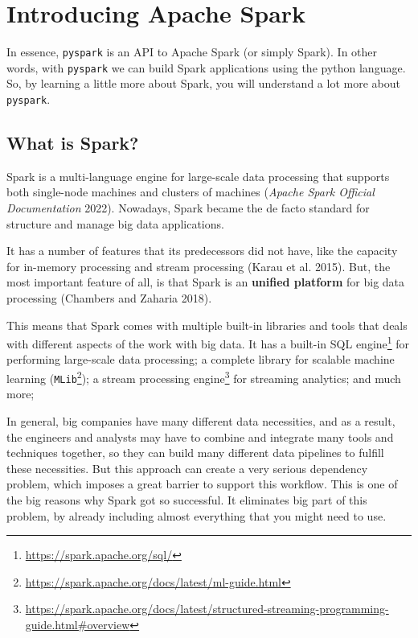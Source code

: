 \documentclass[
  11pt,
  letterpaper,
  DIV=11,
  numbers=noendperiod]{scrreprt}
\begin{document}

\hypertarget{sec-introd-spark}{%
\chapter{Introducing Apache Spark}\label{sec-introd-spark}}

In essence, \texttt{pyspark} is an API to Apache Spark (or simply
Spark). In other words, with \texttt{pyspark} we can build Spark
applications using the python language. So, by learning a little more
about Spark, you will understand a lot more about \texttt{pyspark}.

\hypertarget{what-is-spark}{%
\section{What is Spark?}\label{what-is-spark}}

Spark is a multi-language engine for large-scale data processing that
supports both single-node machines and clusters of machines
(\emph{Apache Spark Official Documentation} 2022). Nowadays, Spark
became the de facto standard for structure and manage big data
applications.

It has a number of features that its predecessors did not have, like the
capacity for in-memory processing and stream processing (Karau et al.
2015). But, the most important feature of all, is that Spark is an
\textbf{unified platform} for big data processing (Chambers and Zaharia
2018).

This means that Spark comes with multiple built-in libraries and tools
that deals with different aspects of the work with big data. It has a
built-in SQL engine\footnote{\url{https://spark.apache.org/sql/}} for
performing large-scale data processing; a complete library for scalable
machine learning (\texttt{MLib}\footnote{\url{https://spark.apache.org/docs/latest/ml-guide.html}});
a stream processing engine\footnote{\url{https://spark.apache.org/docs/latest/structured-streaming-programming-guide.html\#overview}}
for streaming analytics; and much more;

In general, big companies have many different data necessities, and as a
result, the engineers and analysts may have to combine and integrate
many tools and techniques together, so they can build many different
data pipelines to fulfill these necessities. But this approach can
create a very serious dependency problem, which imposes a great barrier
to support this workflow. This is one of the big reasons why Spark got
so successful. It eliminates big part of this problem, by already
including almost everything that you might need to use.
\end{document}
